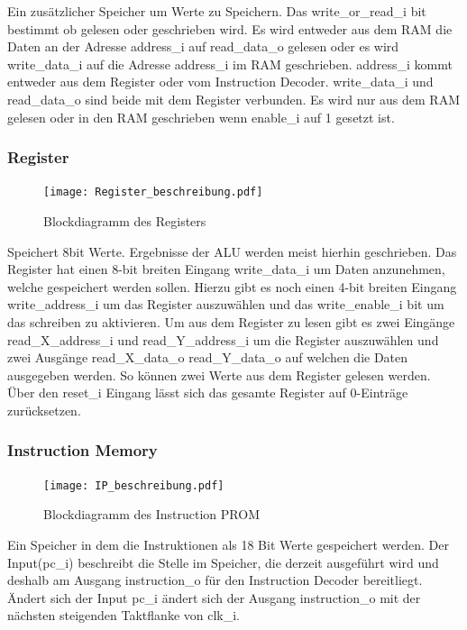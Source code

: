 \documentclass{scrartcl}
\begin{document}
Ein zusätzlicher Speicher um Werte zu Speichern. Das write\_or\_read\_i bit bestimmt ob gelesen oder geschrieben wird. Es wird entweder aus dem RAM die Daten an der Adresse address\_i auf read\_data\_o gelesen  oder es wird write\_data\_i auf die Adresse address\_i im RAM geschrieben. address\_i kommt entweder aus dem Register oder vom Instruction Decoder. write\_data\_i und read\_data\_o sind beide mit dem Register verbunden. Es wird nur aus dem RAM gelesen oder in den RAM geschrieben wenn enable\_i auf 1 gesetzt ist.


\subsubsection{Register}
\begin{figure}[H]
    \centering
    \texttt{[image: Register\_beschreibung.pdf]}
    \caption{Blockdiagramm des Registers}
    \label{fig:Block_Register}
\end{figure}

Speichert 8bit Werte. Ergebnisse der ALU werden meist hierhin geschrieben. Das Register hat einen 8-bit breiten Eingang write\_data\_i um Daten anzunehmen, welche gespeichert werden sollen. Hierzu gibt es noch einen 4-bit breiten Eingang write\_address\_i um das Register auszuwählen und das write\_enable\_i bit um das schreiben zu aktivieren. Um aus dem Register zu lesen gibt es zwei Eingänge read\_X\_address\_i und read\_Y\_address\_i um die Register auszuwählen und zwei Ausgänge read\_X\_data\_o read\_Y\_data\_o auf welchen die Daten ausgegeben werden. So können zwei Werte aus dem Register gelesen werden. Über den reset\_i Eingang lässt sich das gesamte Register auf 0-Einträge zurücksetzen.


\subsubsection{Instruction Memory}
\begin{figure}[H]
    \centering
    \texttt{[image: IP\_beschreibung.pdf]}
    \caption{Blockdiagramm des Instruction PROM}
    \label{fig:Block_InstructionPROM}
\end{figure}

Ein Speicher in dem die Instruktionen als 18 Bit Werte gespeichert werden. Der Input(pc\_i) beschreibt die Stelle im Speicher, die derzeit ausgeführt wird und deshalb am Ausgang instruction\_o für den Instruction Decoder bereitliegt. Ändert sich der Input pc\_i ändert sich der Ausgang instruction\_o mit der nächsten steigenden Taktflanke von clk\_i.
\end{document}
